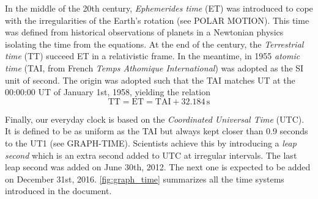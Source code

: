 \documentclass[../main.tex]{subfiles}
\begin{document}
In the middle of the 20th century, \emph{Ephemerides time} (ET) was introduced to cope with the irregularities of the Earth's rotation (see POLAR MOTION). This time was defined from historical observations of planets in a Newtonian physics isolating the time from the equations. At the end of the century, the \emph{Terrestrial time} (TT) succeed ET in a relativistic frame. In the meantime, in 1955 \emph{atomic time} (TAI, from French \emph{Temps Athomique International}) was adopted as the SI unit of second. The origin was adopted such that the TAI matches UT at the 00:00:00 UT of January 1st, 1958, yielding the relation
\begin{equation}
  \text{TT}=\text{ET}= \text{TAI} + 32.184\,\mathrm{s}
\end{equation}

Finally, our everyday clock is based on the \emph{Coordinated Universal Time} (UTC). It is defined to be as uniform as the TAI but always kept closer than 0.9 seconds to the UT1 (see GRAPH-TIME). Scientists achieve this by introducing a \emph{leap second} which is an extra second added to UTC at irregular intervals. The last leap second was added on June 30th, 2012. The next one is expected to be added on December 31st, 2016.
\cref{fig:graph_time} summarizes all the time systems introduced in the document.
\end{document}
